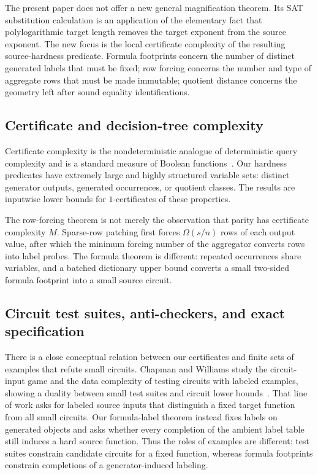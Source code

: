 \documentclass[11pt]{article}
\theoremstyle{definition}
\begin{document}
The present paper does not offer a new general magnification theorem.  Its SAT substitution calculation is an application of the elementary fact that polylogarithmic target length removes the target exponent from the source exponent.  The new focus is the local certificate complexity of the resulting source-hardness predicate.  Formula footprints concern the number of distinct generated labels that must be fixed; row forcing concerns the number and type of aggregate rows that must be made immutable; quotient distance concerns the geometry left after sound equality identifications.

\subsection{Certificate and decision-tree complexity}

Certificate complexity is the nondeterministic analogue of deterministic query complexity and is a standard measure of Boolean functions~\cite{Nisan91,BuhrmanDeWolf02}.  Our hardness predicates have extremely large and highly structured variable sets: distinct generator outputs, generated occurrences, or quotient classes.  The results are inputwise lower bounds for $1$-certificates of these properties.

The row-forcing theorem is not merely the observation that parity has certificate complexity $M$.  Sparse-row patching first forces $\Omega(s/n)$ rows of each output value, after which the minimum forcing number of the aggregator converts rows into label probes.  The formula theorem is different: repeated occurrences share variables, and a batched dictionary upper bound converts a small two-sided formula footprint into a small source circuit.

\subsection{Circuit test suites, anti-checkers, and exact specification}

There is a close conceptual relation between our certificates and finite sets of examples that refute small circuits.  Chapman and Williams study the circuit-input game and the data complexity of testing circuits with labeled examples, showing a duality between small test suites and circuit lower bounds~\cite{ChapmanWilliams15}.  That line of work asks for labeled source inputs that distinguish a fixed target function from all small circuits.  Our formula-label theorem instead fixes labels on generated objects and asks whether every completion of the ambient label table still induces a hard source function.  Thus the roles of examples are different: test suites constrain candidate circuits for a fixed function, whereas formula footprints constrain completions of a generator-induced labeling.
\end{document}
